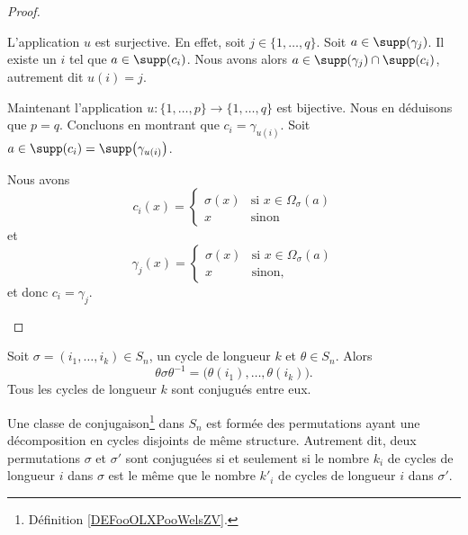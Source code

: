 \begin{proof}
\begin{subproof}
		L'application \( u\) est surjective. En effet, soit \( j\in \{ 1,\ldots, q \}\). Soit \( a\in \supp(\gamma_j)\). Il existe un \( i\) tel que \( a\in\supp(c_i)\). Nous avons alors \( a\in\supp(\gamma_j)\cap\supp(c_i)\), autrement dit \( u(i)=j\).

		Maintenant l'application \( u\colon \{ 1,\ldots, p \}\to \{ 1,\ldots, q \}\) est bijective. Nous en déduisons que \( p=q\). Concluons en montrant que \( c_i=\gamma_{u(i)}\). Soit \( a\in\supp(c_i)=\supp\big( \gamma_{u(i)} \big)\).

		Nous avons
		\begin{equation}
			c_i(x)=\begin{cases}
				\sigma(x) & \text{si } x\in\Omega_{\sigma}(a) \\
				x         & \text{sinon }
			\end{cases}
		\end{equation}
		et
		\begin{equation}
			\gamma_j(x)=\begin{cases}
				\sigma(x) & \text{si } x\in\Omega_{\sigma}(a) \\
				x         & \text{sinon, }
			\end{cases}
		\end{equation}
		et donc \( c_i=\gamma_j\).
	\end{subproof}
\end{proof}


\begin{lemma}        \label{LemmvZFWP}
	Soit \( \sigma=(i_1,\ldots, i_k)\in S_n\), un cycle de longueur \( k\) et \( \theta\in S_n\). Alors
	\begin{equation}
		\theta\sigma\theta^{-1}=\big( \theta(i_1),\ldots, \theta(i_k) \big).
	\end{equation}
	Tous les cycles de longueur \( k\) sont conjugués entre eux.
\end{lemma}

\begin{proposition} \label{PropEAHWXwe}
	Une classe de conjugaison\footnote{Définition \ref{DEFooOLXPooWelsZV}.} dans \( S_n\) est formée des permutations ayant une décomposition en cycles disjoints de même structure. Autrement dit, deux permutations \( \sigma\) et \( \sigma'\) sont conjuguées si et seulement si le nombre \( k_i\) de cycles de longueur \( i\) dans \( \sigma\) est le même que le nombre \( k'_i\) de cycles de longueur \( i\) dans \( \sigma'\).
\end{proposition}

